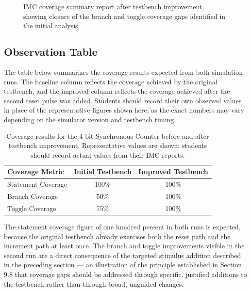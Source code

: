 \begin{figure}[H]
\centering
\caption{IMC coverage summary report after testbench improvement, showing closure of the branch and toggle coverage gaps identified in the initial analysis.}
\end{figure}

\subsection{Observation Table}

The table below summarizes the coverage results expected from both simulation runs. The baseline column reflects the coverage achieved by the original testbench, and the improved column reflects the coverage achieved after the second reset pulse was added. Students should record their own observed values in place of the representative figures shown here, as the exact numbers may vary depending on the simulator version and testbench timing.

\begin{table}[H]
\centering
\begin{tabular}{|l|c|c|}
\hline
\textbf{Coverage Metric} & \textbf{Initial Testbench} & \textbf{Improved Testbench} \\
\hline
Statement Coverage & 100\% & 100\% \\
Branch Coverage    & 50\%  & 100\% \\
Toggle Coverage    & 75\%  & 100\% \\
\hline
\end{tabular}
\caption{Coverage results for the 4-bit Synchronous Counter before and after testbench improvement. Representative values are shown; students should record actual values from their IMC reports.}
\label{tab:coverage-results}
\end{table}

The statement coverage figure of one hundred percent in both runs is expected, because the original testbench already exercises both the reset path and the increment path at least once. The branch and toggle improvements visible in the second run are a direct consequence of the targeted stimulus addition described in the preceding section — an illustration of the principle established in Section 9.8 that coverage gaps should be addressed through specific, justified additions to the testbench rather than through broad, unguided changes.\

